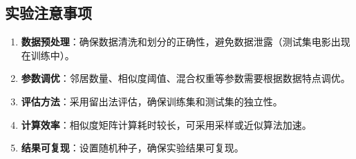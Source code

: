 \documentclass[a4paper]{article}
\begin{document}
\subsection{实验注意事项}

\begin{enumerate}
    \item \textbf{数据预处理}：确保数据清洗和划分的正确性，避免数据泄露（测试集电影出现在训练中）。
    \item \textbf{参数调优}：邻居数量、相似度阈值、混合权重等参数需要根据数据特点调优。
    \item \textbf{评估方法}：采用留出法评估，确保训练集和测试集的独立性。
    \item \textbf{计算效率}：相似度矩阵计算耗时较长，可采用采样或近似算法加速。
    \item \textbf{结果可复现}：设置随机种子，确保实验结果可复现。
\end{enumerate}
\end{document}
